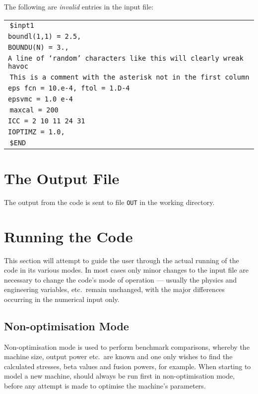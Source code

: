 The following are {\em invalid}\/ entries in the input file:
\begin{center}
\begin{tabular}{||l}
$\:$\tt \$inpt1                          \\ %
$\!\!$\tt boundl(1,1) = 2.5,             \\
$\!\!$\tt BOUNDU(N) = 3.,                \\
$\!\!$\tt A line of `random' characters like this will clearly wreak havoc\\
$\:$\tt * This is a comment with the asterisk not in the first column\\
$\!\!$\tt eps fcn = 10.e-4, ftol = 1.D-4 \\
$\!\!$\tt epsvmc = 1.0 e-4               \\
$\:$\tt maxcal = 200                     \\
$\!\!$\tt ICC =   2  10  11  24  31      \\
$\!\!$\tt IOPTIMZ = 1.0,                 \\
$\:$\tt \$END                            \\ %
\end{tabular}
\end{center}

\section{The Output File}

The output from the code is sent to file \texttt{OUT} in the working
directory.

\section{Running the Code}

This section will attempt to guide the user through the actual running of the
code in its various modes. In most cases only minor changes to the input file
are necessary to change the code's mode of operation --- usually the physics
and engineering variables, etc.\ remain unchanged, with the major differences
occurring in the numerical input only.

\subsection{Non-optimisation Mode}

Non-optimisation mode is used to perform benchmark comparisons, whereby the
machine size, output power etc.\ are known and one only wishes to find the
calculated stresses, beta values and fusion powers, for example. When starting
to model a new machine, \PS should always be run first in non-optimisation
mode, before any attempt is made to optimise the machine's parameters.

